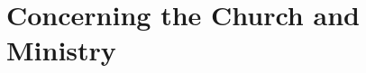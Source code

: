 \documentclass[../main.tex]{subfiles}
\begin{document}
	
	\chapter{Concerning the Church and Ministry}
	
	
	
	\theendnotes
	\setcounter{endnote}{0}
\end{document}
